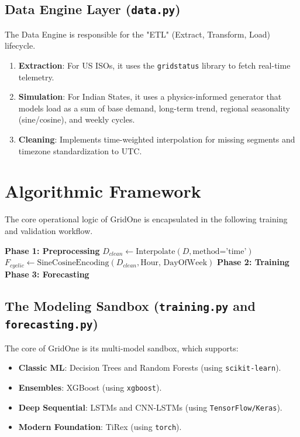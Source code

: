 \documentclass[12pt,a4paper,twoside,fleqn]{report}
\begin{document}
\subsection{Data Engine Layer (\texttt{data.py})}
The Data Engine is responsible for the "ETL" (Extract, Transform, Load) lifecycle.
\begin{enumerate}
    \item \textbf{Extraction}: For US ISOs, it uses the \texttt{gridstatus} library to fetch real-time telemetry.
    \item \textbf{Simulation}: For Indian States, it uses a physics-informed generator that models load as a sum of base demand, long-term trend, regional seasonality (sine/cosine), and weekly cycles.
    \item \textbf{Cleaning}: Implements time-weighted interpolation for missing segments and timezone standardization to UTC.
\end{enumerate}

\section{Algorithmic Framework}
The core operational logic of GridOne is encapsulated in the following training and validation workflow.

\begin{algorithm}[H]
\SetAlgoLined
{}
 \textbf{Phase 1: Preprocessing}\;
 $D_{clean} \leftarrow \text{Interpolate}(D, \text{method='time'})$\;
 $F_{cyclic} \leftarrow \text{SineCosineEncoding}(D_{clean}, \text{Hour, DayOfWeek})$\;
 \textbf{Phase 2: Training}\;
 \textbf{Phase 3: Forecasting}\;
 \caption{GridOne Pipeline: From Telemetry to Multi-Step Forecast}
\end{algorithm}

\subsection{The Modeling Sandbox (\texttt{training.py} and \texttt{forecasting.py})}
The core of GridOne is its multi-model sandbox, which supports:
\begin{itemize}
    \item \textbf{Classic ML}: Decision Trees and Random Forests (using \texttt{scikit-learn}).
    \item \textbf{Ensembles}: XGBoost (using \texttt{xgboost}).
    \item \textbf{Deep Sequential}: LSTMs and CNN-LSTMs (using \texttt{TensorFlow/Keras}).
    \item \textbf{Modern Foundation}: TiRex (using \texttt{torch}).
\end{itemize}
\end{document}
